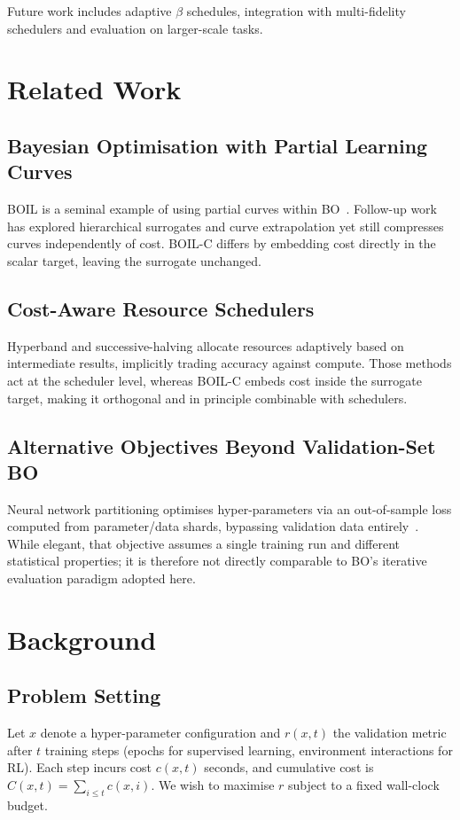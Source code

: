 \documentclass{article} %
\begin{document}
Future work includes adaptive \(\beta\) schedules, integration with multi-fidelity schedulers and evaluation on larger-scale tasks.

\section{Related Work}
\label{sec:related}%
%
\subsection{Bayesian Optimisation with Partial Learning Curves}
BOIL is a seminal example of using partial curves within BO~\cite{nguyen-2019-bayesian}. Follow-up work has explored hierarchical surrogates and curve extrapolation yet still compresses curves independently of cost. BOIL-C differs by embedding cost directly in the scalar target, leaving the surrogate unchanged.

\subsection{Cost-Aware Resource Schedulers}
Hyperband and successive-halving allocate resources adaptively based on intermediate results, implicitly trading accuracy against compute. Those methods act at the scheduler level, whereas BOIL-C embeds cost inside the surrogate target, making it orthogonal and in principle combinable with schedulers.

\subsection{Alternative Objectives Beyond Validation-Set BO}
Neural network partitioning optimises hyper-parameters via an out-of-sample loss computed from parameter/data shards, bypassing validation data entirely~\cite{mlodozeniec-2023-hyperparameter}. While elegant, that objective assumes a single training run and different statistical properties; it is therefore not directly comparable to BO's iterative evaluation paradigm adopted here.

\section{Background}
\label{sec:background}%
%
\subsection{Problem Setting}
Let \(x\) denote a hyper-parameter configuration and \(r(x,t)\) the validation metric after \(t\) training steps (epochs for supervised learning, environment interactions for RL). Each step incurs cost \(c(x,t)\) seconds, and cumulative cost is \(C(x,t) = \sum_{i \le t} c(x,i)\). We wish to maximise \(r\) subject to a fixed wall-clock budget.
\end{document}
